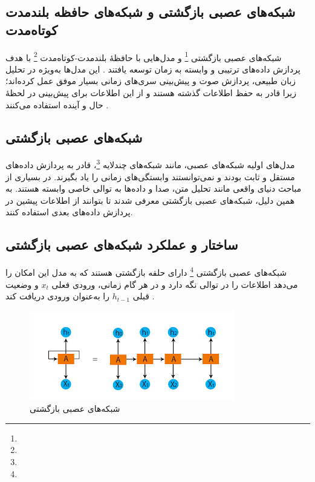 \subsection{شبکه‌های عصبی بازگشتی و شبکه‌های حافظه بلندمدت کوتاه‌مدت}
شبکه‌های عصبی بازگشتی \footnote{} و مدل‌هایی با حافظهٔ بلندمدت-کوتاه‌مدت \footnote{} با هدف پردازش داده‌های ترتیبی و وابسته به زمان توسعه یافتند
\cite{rumelhart1986learning,hochreiter1997long}.
این مدل‌ها به‌ویژه در تحلیل زبان طبیعی، پردازش صوت و پیش‌بینی سری‌های زمانی بسیار موفق عمل کرده‌اند؛ زیرا قادر به حفظ اطلاعات گذشته هستند و از این اطلاعات برای پیش‌بینی در لحظهٔ حال و آینده استفاده می‌کنند
\cite{gers1999learning}.

\subsection{شبکه‌های عصبی بازگشتی}
مدل‌های اولیه شبکه‌های عصبی، مانند شبکه‌های چندلایه \footnote{}، قادر به پردازش داده‌های مستقل و ثابت بودند و نمی‌توانستند وابستگی‌های زمانی را یاد بگیرند\cite{bishop2006pattern}.
در بسیاری از مباحث دنیای واقعی مانند تحلیل متن، صدا و  داده‌ها به توالی خاصی وابسته هستند. به همین دلیل، شبکه‌های عصبی بازگشتی معرفی شدند تا بتوانند از اطلاعات پیشین در پردازش داده‌های بعدی استفاده کنند\cite{rumelhart1986learning}.


\subsection{ساختار و عملکرد شبکه‌های عصبی بازگشتی}
شبکه‌های عصبی بازگشتی \footnote{} دارای حلقه بازگشتی هستند که به مدل این امکان را می‌دهد اطلاعات را در توالی نگه دارد و در هر گام زمانی، ورودی فعلی \( x_t \) و وضعیت قبلی \( h_{t-1} \) را به‌عنوان ورودی دریافت کند \cite{goodfellow2016deep}.  

\begin{figure}[h]
	\centering
	\begin{minipage}[b]{0.7\textwidth}
		\centering
		\includegraphics[width=\textwidth]{transformer_images/rnn_image.png}
		\caption{شبکه‌های عصبی بازگشتی}
		\label{fig:recurrent neural network}
	\end{minipage}
	\hfill
\end{figure}

